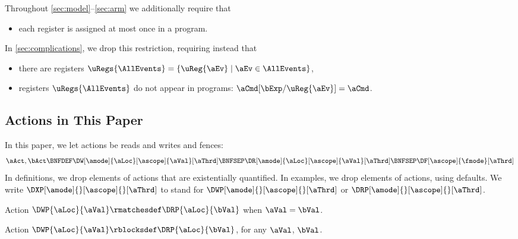 Throughout \textsection\ref{sec:model}--\ref{sec:arm} we 
additionally require that
\begin{itemize}
\item each register is assigned at most once in a program.
\end{itemize}
In \textsection\ref{sec:complications}, we drop this restriction, requiring
instead that
\begin{itemize}
\item there are registers
  $\uRegs{\AllEvents}=\{\uReg{\aEv}\mid\aEv\in\AllEvents\}$,
\item registers $\uRegs{\AllEvents}$ do not appear in programs: $\aCmd[\bExp/\uReg{\aEv}]=\aCmd$.
\end{itemize}


\subsection{Actions in This Paper}

In this paper, we let actions be reads and writes and fences:
\begin{displaymath}
  \aAct,\bAct \BNFDEF \DW[\amode]{\aLoc}[\ascope]{\aVal}[\aThrd]
  \BNFSEP \DR[\amode]{\aLoc}[\ascope]{\aVal}[\aThrd]
  \BNFSEP \DF[\ascope]{\fmode}[\aThrd]
\end{displaymath}
In definitions, we drop elements of actions that are existentially
quantified.  In examples, we drop elements of actions, using defaults.  We
write $\DXP[\amode]{}[\ascope]{}[\aThrd]$ to stand for
$\DWP[\amode]{}[\ascope]{}[\aThrd]$ or $\DRP[\amode]{}[\ascope]{}[\aThrd]$.

Action $\DWP{\aLoc}{\aVal} \rmatchesdef \DRP{\aLoc}{\bVal}$ when $\aVal=\bVal$.

Action $\DWP{\aLoc}{\aVal} \rblocksdef \DRP{\aLoc}{\bVal}$, for any $\aVal$, $\bVal$.

